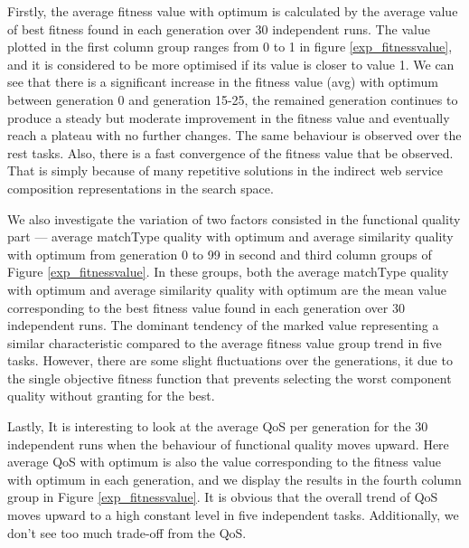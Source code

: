 \documentclass{llncs}
\begin{document}
Firstly, the average fitness value with optimum is calculated by the average value of best fitness found in each generation over 30 independent runs. The value plotted in the first column group ranges from 0 to 1 in figure \ref{exp_fitnessvalue}, and it is considered to be more optimised if its value is closer to value 1. We can see that there is a significant increase in the fitness value (avg) with optimum between generation 0 and generation 15-25, the remained generation continues to produce a steady but moderate improvement in the fitness value and eventually reach a plateau with no further changes. The same behaviour is observed over the rest tasks. Also, there is a fast convergence of the fitness value that be observed. That is simply because of many repetitive solutions in the indirect web service composition representations in the search space.

We also investigate the variation of two factors consisted in the functional quality part --- average matchType quality with optimum and average similarity quality with optimum from generation 0 to 99 in second and third column groups of Figure \ref{exp_fitnessvalue}. In these groups,  both the average matchType quality with optimum and average similarity quality with optimum are the mean value corresponding to the best fitness value found in each generation over 30 independent runs. The dominant tendency of the marked value representing a similar characteristic compared to the average fitness value group trend in five tasks. However, there are some slight fluctuations over the generations, it due to the single objective fitness function that prevents selecting the worst component quality without granting for the best.

Lastly, It is interesting to look at the average QoS per generation for the 30 independent runs when the behaviour of functional quality moves upward. Here average QoS with optimum is also the value corresponding to the fitness value with optimum in each generation, and we display the results in the fourth column group in Figure \ref{exp_fitnessvalue}. It is obvious that the overall trend of QoS moves upward to a high constant level in five independent tasks. Additionally, we don't see too much trade-off from the QoS.
\end{document}
